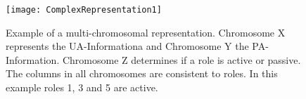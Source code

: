 	\begin{figure}[H]
		\centering
		\texttt{[image: ComplexRepresentation1]}
		\caption{Example of a multi-chromosomal representation. Chromosome X represents the UA-Informationa and Chromosome Y the PA-Information. Chromosome Z determines if a role is active or passive. The columns in all chromosomes are consistent to roles. In this example roles 1, 3 and 5 are active.}
		\label{fig:representation2}
	\end{figure}